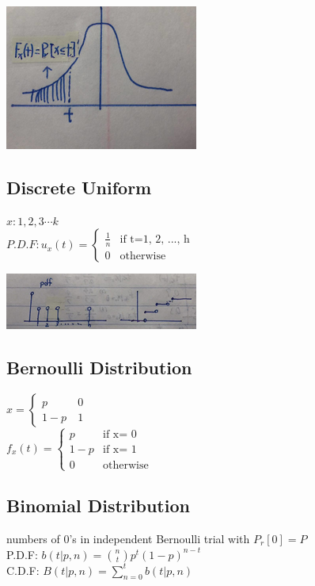\documentclass{article}
\begin{document}
\begin{center}{
\includegraphics{continupdf.png}
}
\end{center}		

	               
\subsection{Discrete Uniform}            
	$ x: 1,2,3 \cdots k$
	\\$ P.D.F: u_x(t)= \begin{cases} \frac{1}{n}  & \text{if t=1, 2, ..., h} \\ 	
	0& \text{otherwise} \end{cases}$

\begin{center}{
\includegraphics{discreteuniform.png}
}
\end{center}	
           
\subsection{Bernoulli Distribution}             	
	$x= \begin{cases} p  &\ 0 \\ 
	1-p &\ 1 \end{cases}$
	\\$f_x(t)= \begin{cases} p  &\text{if x= 0} \\ 
	1-p &\text{if x= 1} \\
	0 &\text{otherwise}\end{cases}$

\subsection{Binomial Distribution} 
	numbers of 0's in independent Bernoulli trial with $P_r[0]= P$
	\\P.D.F: $b(t| p, n)= {n \choose t}p^t (1-p)^{n-t}$
	\\C.D.F: $B(t| p, n)= \sum_{n=0}^t b(t| p, n)$
	
\end{document}
